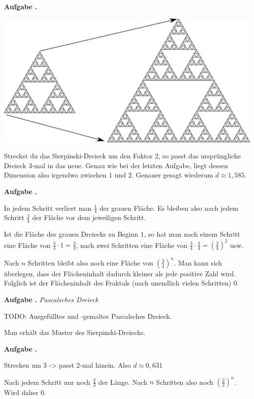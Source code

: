 \documentclass[a4paper,ngerman,12pt]{scrartcl}
\theoremstyle{definition}
\theoremstyle{plain}
\theoremstyle{remark}
\newlength{\aufgabenskip}
\newcounter{aufgabennummer}
\newenvironment{aufgabe}[1]{
  \addtocounter{aufgabennummer}{1}
  \textbf{Aufgabe \theaufgabennummer.} \emph{#1} \par
}{\vspace{\aufgabenskip}}
\begin{document}
\begin{aufgabe}{}\label{aufgabe:Sierpinski-Flaeche}
	\begin{center}
		\includegraphics[width=.7\textwidth]{Bilder/Sierpinski-Dreieck-Vergroessern.pdf}
	\end{center}
	Streckst du das Sierpinski-Dreieck um den Faktor $2$, so passt das ursprüngliche Dreieck $3$-mal in das neue. Genau wie bei der letzten Aufgabe, liegt dessen Dimension also irgendwo zwischen $1$ und $2$. Genauer gesagt wiederum $d \approx 1,585$.
\end{aufgabe}

\begin{aufgabe}{}
	In jedem Schritt verliert man $\frac{1}{4}$ der grauen Fläche. Es bleiben also nach jedem Schritt $\frac{3}{4}$ der Fläche vor dem jeweiligen Schritt.
	
	Ist die Fläche des grauen Dreiecks zu Beginn $1$, so hat man nach einem Schritt eine Fläche von $\frac{3}{4}\cdot 1 = \frac{3}{4}$, nach zwei Schritten eine Fläche von $\frac{3}{4} \cdot \frac{3}{4} = \left(\frac{3}{4}\right)^2$ usw.
	
	Nach $n$ Schritten bleibt also noch eine Fläche von $\left(\frac{3}{4}\right)^n$. Man kann sich überlegen, dass der Flächeninhalt dadurch kleiner als jede positive Zahl wird. Folglich ist der Flächeninhalt des Fraktals (\glqq nach unendlich vielen Schritten\grqq) $0$.
\end{aufgabe}

\begin{aufgabe}{Pascalsches Dreieck}
	TODO: Ausgefülltes und -gemaltes Pascalsches Dreieck.
	
	Man erhält das Muster des Sierpinski-Dreiecks.
\end{aufgabe}

\begin{aufgabe}{}
	Strecken um 3 -> passt 2-mal hinein. Also $d \approx 0,631$
	
	Nach jedem Schritt nur noch $\frac{2}{3}$ der Länge. Nach $n$ Schritten also noch $\left(\frac{2}{3}\right)^n$. Wird daher 0.
\end{aufgabe}
\end{document}
